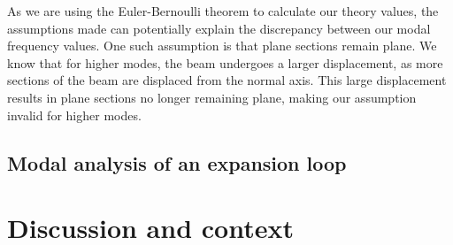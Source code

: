 As we are using the Euler-Bernoulli theorem to calculate our theory values, the assumptions made can potentially explain the discrepancy between our modal frequency values. One such assumption is that plane sections remain plane. We know that for higher modes, the beam undergoes a larger displacement, as more sections of the beam are displaced from the normal axis. This large displacement results in plane sections no longer remaining plane, making our assumption invalid for higher modes.
\subsection{Modal analysis of an expansion loop}
\section{Discussion and context}


